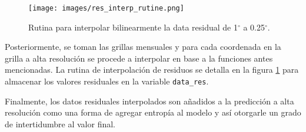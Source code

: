     \begin{figure}[H]
        \centering
              \texttt{[image: images/res\_interp\_rutine.png]}
              \vskip -0.1in
        \caption[Rutina de interpolación de residuos]{\footnotesize Rutina para interpolar bilinearmente la data residual de 1$^{\circ}$ a 0.25$^{\circ}$.}
        \label{logo5}
    \end{figure}

    Posteriormente, se toman las grillas mensuales y para cada coordenada en la grilla a alta resolución se procede a interpolar en base a la funciones antes mencionadas. La rutina de interpolación de residuos se detalla en la figura \ref{logo5} para almacenar los valores residuales en la variable \texttt{data\_res}.
    
    Finalmente, los datos residuales interpolados son añadidos a la predicción a alta resolución como una forma de agregar entropía al modelo y así otorgarle un grado de intertidumbre al valor final.



   